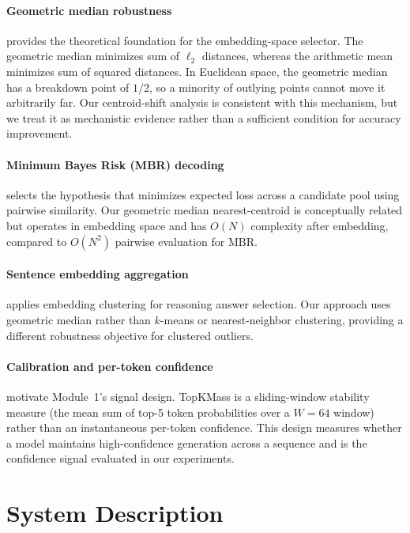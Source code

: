 \documentclass[11pt]{article}
\begin{document}
\paragraph{Geometric median robustness \citep{weiszfeld1937point,minsker2015geometric}}
provides the theoretical foundation for the embedding-space selector. The
geometric median minimizes sum of $\ell_2$ distances, whereas the arithmetic mean
minimizes sum of squared distances. In Euclidean space, the geometric median has
a breakdown point of $1/2$, so a minority of outlying points cannot move it
arbitrarily far. Our centroid-shift analysis is consistent with this mechanism,
but we treat it as mechanistic evidence rather than a sufficient condition for
accuracy improvement.

\paragraph{Minimum Bayes Risk (MBR) decoding \citep{eikema2020map}}
selects the hypothesis that minimizes expected loss across a candidate pool using
pairwise similarity. Our geometric median nearest-centroid is conceptually
related but operates in embedding space and has $O(N)$ complexity after
embedding, compared to $O(N^2)$ pairwise evaluation for MBR.

\paragraph{Sentence embedding aggregation \citep{li2023making}}
applies embedding clustering for reasoning answer selection. Our approach uses
geometric median rather than $k$-means or nearest-neighbor clustering, providing
a different robustness objective for clustered outliers.

\paragraph{Calibration and per-token confidence \citep{guo2017calibration}}
motivate Module~1's signal design. TopKMass is a sliding-window
stability measure (the mean sum of top-5 token probabilities over a $W=64$
window) rather than an instantaneous per-token confidence. This design measures
whether a model maintains high-confidence generation across a sequence and is
the confidence signal evaluated in our experiments.

\section{System Description}
\label{sec:system}
\end{document}
